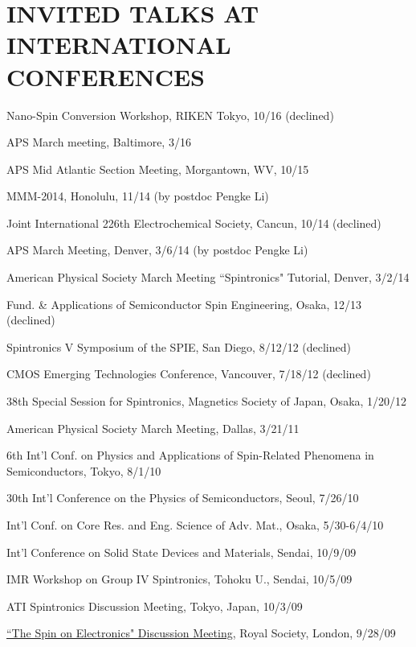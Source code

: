 \documentclass[paper=letter,fontsize=11pt]{scrartcl} %
\newcommand{\NewPart}[2]{\section*{\uppercase{#1} #2}}
\newcommand{\TalkEntry}[4]{
		\noindent #1, #2, #3 #4}
\begin{document}
\NewPart{Invited Talks at International Conferences}{}
\begin{etaremune}
\item\TalkEntry{Nano-Spin Conversion Workshop}{RIKEN Tokyo}{10/16}{(declined)} 
\item\TalkEntry{APS March meeting}{Baltimore}{3/16}{} 
\item\TalkEntry{APS Mid Atlantic Section Meeting}{Morgantown, WV}{10/15}{} 
\item\TalkEntry{MMM-2014}{Honolulu}{11/14}{ (by postdoc Pengke Li)} 
\item\TalkEntry{2014 Joint International 226th Electrochemical Society}{Cancun}{10/14}{ (declined)}
\item\TalkEntry{APS March Meeting}{Denver}{3/6/14}{ (by postdoc Pengke Li)}
\item\TalkEntry{American Physical Society March Meeting ``Spintronics" Tutorial}{Denver}{3/2/14}{} 
\item\TalkEntry{Fund. \& Applications of Semiconductor Spin Engineering}{Osaka}{12/13}{  (declined)}
\item\TalkEntry{Spintronics V Symposium of the SPIE}{San Diego}{8/12/12}{ (declined)}
\item\TalkEntry{CMOS Emerging Technologies Conference}{Vancouver}{7/18/12}{ (declined)}
\item\TalkEntry{38th Special Session for Spintronics, Magnetics Society of Japan}{Osaka}{1/20/12}{}
\item\TalkEntry{American Physical Society March Meeting}{Dallas}{3/21/11}{}
\item\TalkEntry{6th Int’l Conf. on Physics and Applications of Spin-Related Phenomena in Semiconductors}{Tokyo}{8/1/10}{}
\item\TalkEntry{30th Int’l Conference on the Physics of Semiconductors}{Seoul}{7/26/10}{}
\item\TalkEntry{Int’l Conf. on Core Res. and Eng. Science of Adv. Mat.}{Osaka}{5/30-6/4/10 }{}
\item\TalkEntry{Int’l Conference on Solid State Devices and Materials}{Sendai}{10/9/09}{}
\item\TalkEntry{IMR Workshop on Group IV Spintronics}{Tohoku U., Sendai}{10/5/09}{}
\item\TalkEntry{ATI Spintronics Discussion Meeting}{Tokyo, Japan}{10/3/09}{}
\item\TalkEntry{\href{http://rsta.royalsocietypublishing.org/content/369/1951/3553.short?rss=1}{``The Spin on Electronics" Discussion Meeting}}{Royal Society, London}{9/28/09}{}

\end{etaremune}
\end{document}
